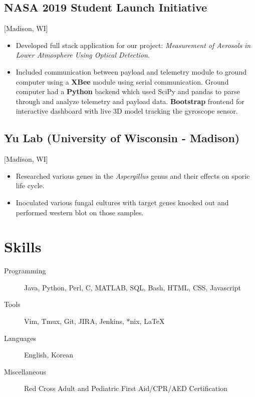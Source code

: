 \documentclass{mycv}
\begin{document}
\subsection{NASA 2019 Student Launch Initiative}[Madison, WI]
\begin{positions}
\end{positions}
\begin{itemize}
  \item Developed full stack application for our project: \textit{Measurement of Aerosols in Lower Atmosphere Using Optical Detection}.  
  \item {
  Included communication between payload and telemetry module to ground computer using a \textbf{XBee} module using serial communication. Ground computer had a \textbf{Python} backend which used SciPy and pandas to parse through and analyze telemetry and payload data. \textbf{Bootstrap} frontend for interactive dashboard with live 3D model tracking the gyroscope sensor.
  }
\end{itemize}


\subsection{Yu Lab (University of Wisconsin - Madison)}[Madison, WI]
\begin{positions}
\end{positions}
\begin{itemize}
  \item{
  Researched various genes in the \textit{Aspergillus} genus and their effects on sporic life cycle. 
  }
  \item{
  Inoculated various fungal cultures with target genes knocked out and performed western blot on those samples. 
  }
\end{itemize}

\section{Skills}
\begin{description}
  \item[Programming] Java, Python, Perl, C, MATLAB, SQL, Bash, HTML, CSS, Javascript
  \item[Tools] Vim, Tmux, Git, JIRA, Jenkins, *nix, \LaTeX 
  \item[Languages] English, Korean
  \item[Miscellaneous] Red Cross Adult and Pediatric First Aid/CPR/AED Certification
\end{description}
\end{document}
